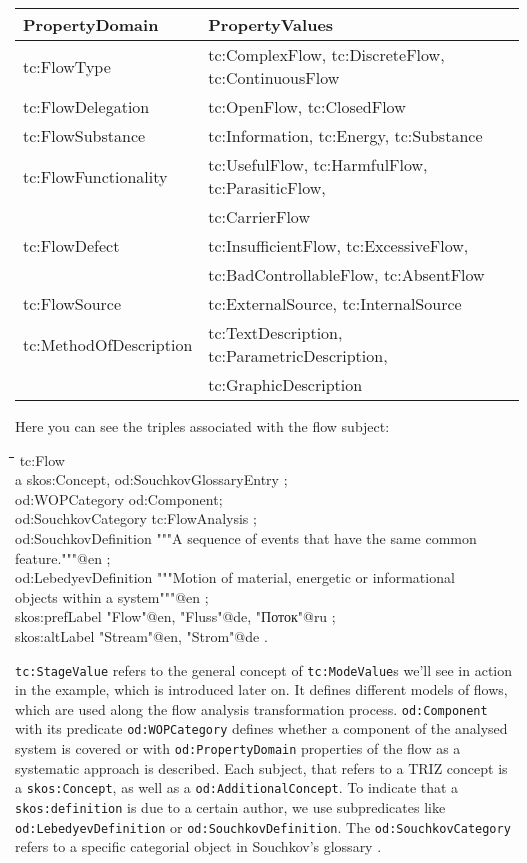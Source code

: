 \documentclass[a4paper,11pt]{article}
\newenvironment{code}{\tt \begin{tabbing}
\hskip12pt\=\hskip12pt\=\hskip12pt\=\hskip12pt\=\hskip5cm\=\hskip5cm\=\kill}
{\end{tabbing}}
\newcommand{\ru}[1]{\foreignlanguage{russian}{#1}}
\begin{document}
\begin{center}
\begin{tabular}{|l|p{10cm}|}\hline
PropertyDomain & PropertyValues \\\hline
tc:FlowType & tc:ComplexFlow, tc:DiscreteFlow, tc:ContinuousFlow \\
tc:FlowDelegation & tc:OpenFlow, tc:ClosedFlow \\
tc:FlowSubstance & tc:Information, tc:Energy, tc:Substance \\
tc:FlowFunctionality & tc:UsefulFlow, tc:HarmfulFlow, tc:ParasiticFlow, \\
& tc:CarrierFlow \\
tc:FlowDefect & tc:InsufficientFlow, tc:ExcessiveFlow, \\
& tc:BadControllableFlow, tc:AbsentFlow \\ 
tc:FlowSource & tc:ExternalSource, tc:InternalSource  \\
tc:MethodOfDescription & tc:TextDescription, tc:ParametricDescription, \\
& tc:GraphicDescription \\\hline 
\end{tabular}
\end{center}

Here you can see the triples associated with the flow subject:
\begin{code}
tc:Flow \\
\> a skos:Concept, od:SouchkovGlossaryEntry ; \\
\> od:WOPCategory od:Component; \\
\> od:SouchkovCategory tc:FlowAnalysis ; \\
\> od:SouchkovDefinition """A sequence of events that have the same common \\
\>\> feature."""@en ; \\
\> od:LebedyevDefinition """Motion of material, energetic or informational \\
\>\> objects within a system"""@en ; \\
\> skos:prefLabel "Flow"@en, "Fluss"@de, "\ru{Поток}"@ru ; \\
\> skos:altLabel "Stream"@en, "Strom"@de . 
\end{code}

\texttt{tc:StageValue} refers to the general concept of \texttt{tc:ModeValue}s
we'll see in action in the example, which is introduced later on. It defines
different models of flows, which are used along the flow analysis
transformation process. \texttt{od:Component} with its predicate
\texttt{od:WOPCategory} defines whether a component of the analysed system is
covered or with \texttt{od:PropertyDomain} properties of the flow as a
systematic approach is described. Each subject, that refers to a TRIZ concept
is a \texttt{skos:Concept}, as well as a \texttt{od:AdditionalConcept}. To
indicate that a \texttt{skos:definition} is due to a certain author, we use
subpredicates like \texttt{od:Lebedyev\-Defini\-tion} or
\texttt{od:SouchkovDefinition}. The \texttt{od:SouchkovCategory} refers to a
specific categorial object in Souchkov's glossary \cite{Souchkov2018}.
\end{document}

